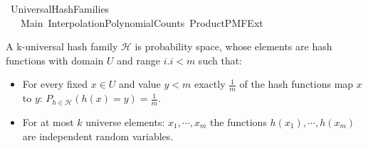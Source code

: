 %
\begin{isabellebody}%
%
%
\isadelimdocument
%
\endisadelimdocument
%
\isatagdocument
%
\isamarkuptrue%
%
\endisatagdocument
{\isafolddocument}%
%
\isadelimdocument
%
\endisadelimdocument
%
\isadelimtheory
%
\endisadelimtheory
%
\isatagtheory
{}\isamarkupfalse%
\ Universal{\isacharunderscore}{\kern0pt}Hash{\isacharunderscore}{\kern0pt}Families\isanewline
\ \ \ Main\ Interpolation{\isacharunderscore}{\kern0pt}Polynomial{\isacharunderscore}{\kern0pt}Counts\ Product{\isacharunderscore}{\kern0pt}PMF{\isacharunderscore}{\kern0pt}Ext\isanewline
{}%
\endisatagtheory
{\isafoldtheory}%
%
\isadelimtheory
%
\endisadelimtheory
%
\begin{isamarkuptext}%
A k-universal hash family $\mathcal H$ is probability space, whose elements are hash functions 
with domain $U$ and range ${i. i < m}$ such that:

\begin{itemize}
\item For every fixed $x \in U$ and value $y < m$ exactly $\frac{1}{m}$ of the hash functions map
  $x$ to $y$: $P_{h \in \mathcal H} \left(h(x) = y\right) = \frac{1}{m}$.
\item For at most $k$ universe elements: $x_1,\cdots,x_m$ the functions $h(x_1), \cdots, h(x_m)$ 
  are independent random variables.
\end{itemize}


\end{isamarkuptext}
\end{isabellebody}
